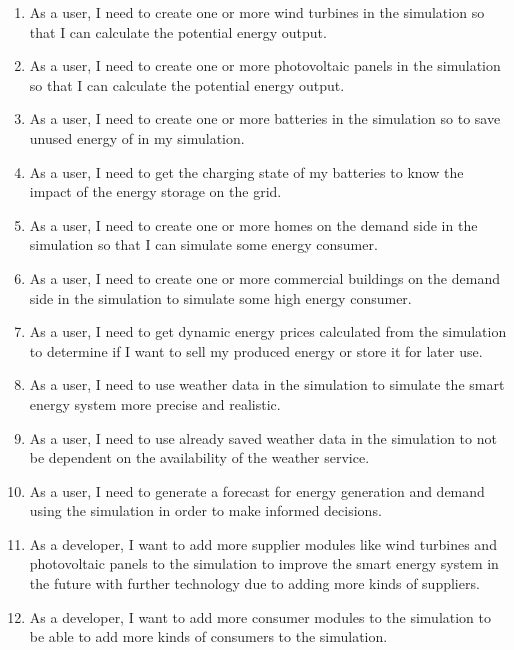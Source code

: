 \begin{enumerate}
\item As a user, I need to create one or more wind turbines in the simulation so that I can calculate the potential energy output.

\item As a user, I need to create one or more photovoltaic panels in the simulation so that I can calculate the potential energy output.

\item As a user, I need to create one or more batteries in the simulation so to save unused energy of in my simulation.

\item As a user, I need to get the charging state of my batteries to know the impact of the energy storage on the grid.

\item As a user, I need to create one or more homes on the demand side in the simulation so that I can simulate some energy consumer.

\item As a user, I need to create one or more commercial buildings on the demand side in the simulation to simulate some high energy consumer.

\item As a user, I need to get dynamic energy prices calculated from the simulation to determine if I want to sell my produced energy or store it for later use.

\item As a user, I need to use weather data in the simulation to simulate the smart energy system more precise and realistic.

\item As a user, I need to use already saved weather data in the simulation to not be dependent on the availability of the weather service.

\item As a user, I need to generate a forecast for energy generation and demand using the simulation in order to make informed decisions.

\item As a developer, I want to add more supplier modules like wind turbines and photovoltaic panels to the simulation to improve the smart energy system in the future with further technology due to adding more kinds of suppliers. 

\item As a developer, I want to add more consumer modules to the simulation to be able to add more kinds of consumers to the simulation. 


\end{enumerate}
